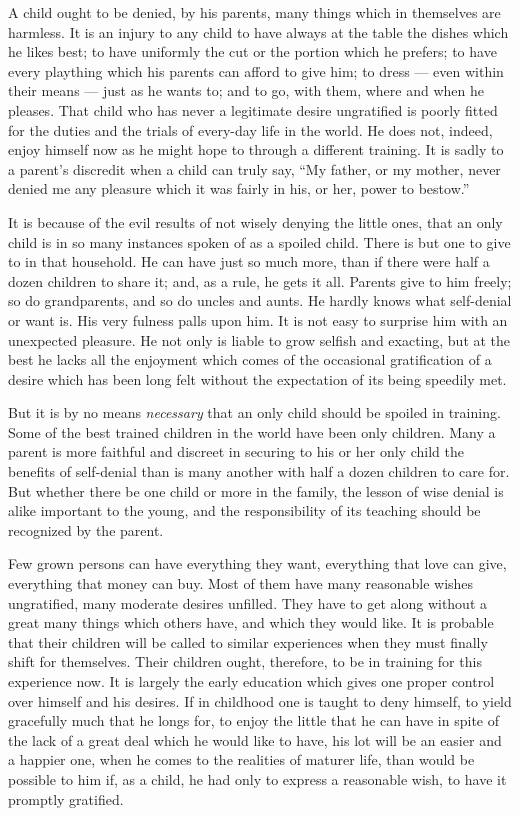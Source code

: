 \documentclass[
]{book}
\begin{document}
A child ought to be denied, by his parents, many things which in themselves are harmless. It is an injury to any child to have always at the table the dishes which he likes best; to have uniformly the cut or the portion which he prefers; to have every plaything which his parents can afford to give him; to dress --- even within their means --- just as he wants to; and to go, with them, where and when he pleases. That child who has never a legitimate desire ungratified is poorly fitted for the duties and the trials of every-day life in the world. He does not, indeed, enjoy himself now as he might hope to through a different training. It is sadly to a parent's discredit when a child can truly say, ``My father, or my mother, never denied me any pleasure which it was fairly in his, or her, power to bestow.''

It is because of the evil results of not wisely denying the little ones, that an only child is in so many instances spoken of as a spoiled child. There is but one to give to in that household. He can have just so much more, than if there were half a dozen children to share it; and, as a rule, he gets it all. Parents give to him freely; so do grandparents, and so do uncles and aunts. He hardly knows what self-denial or want is. His very fulness palls upon him. It is not easy to surprise him with an unexpected pleasure. He not only is liable to grow selfish and exacting, but at the best he lacks all the enjoyment which comes of the occasional gratification of a desire which has been long felt without the expectation of its being speedily met.

But it is by no means \emph{necessary} that an only child should be spoiled in training. Some of the best trained children in the world have been only children. Many a parent is more faithful and discreet in securing to his or her only child the benefits of self-denial than is many another with half a dozen children to care for. But whether there be one child or more in the family, the lesson of wise denial is alike important to the young, and the responsibility of its teaching should be recognized by the parent.

Few grown persons can have everything they want, everything that love can give, everything that money can buy. Most of them have many reasonable wishes ungratified, many moderate desires unfilled. They have to get along without a great many things which others have, and which they would like. It is probable that their children will be called to similar experiences when they must finally shift for themselves. Their children ought, therefore, to be in training for this experience now. It is largely the early education which gives one proper control over himself and his desires. If in childhood one is taught to deny himself, to yield gracefully much that he longs for, to enjoy the little that he can have in spite of the lack of a great deal which he would like to have, his lot will be an easier and a happier one, when he comes to the realities of maturer life, than would be possible to him if, as a child, he had only to express a reasonable wish, to have it promptly gratified.
\end{document}
